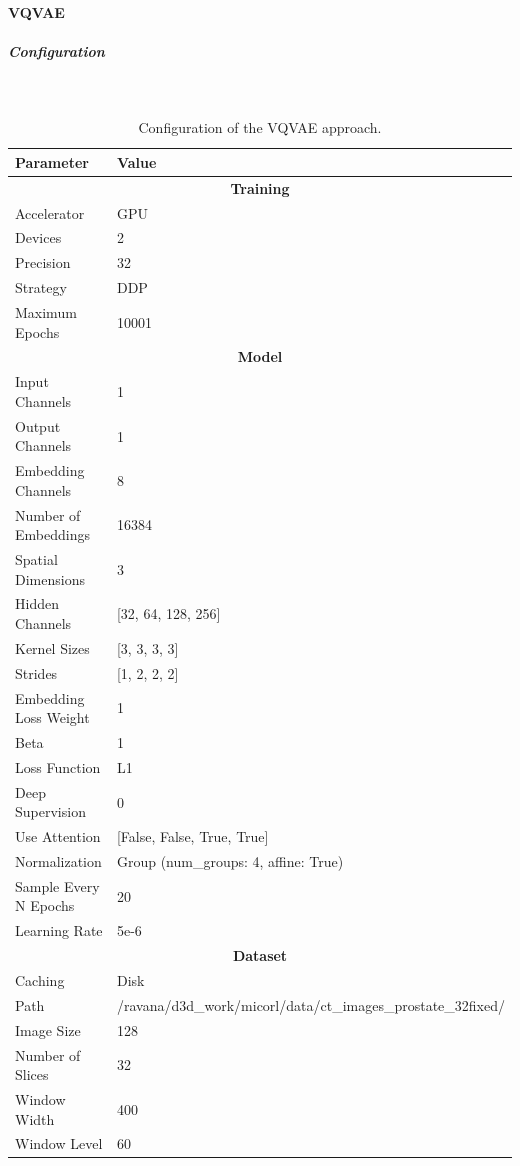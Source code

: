 
\paragraph{VQVAE}\mbox{}
\subparagraph{Configuration}\mbox{}\\

\begin{table}[h!]
\centering
\begin{tabular}{|l|l|}
\hline
\textbf{Parameter} & \textbf{Value} \\
\hline
\multicolumn{2}{|c|}{\textbf{Training}} \\
\hline
Accelerator & GPU \\
\hline
Devices & 2 \\
\hline
Precision & 32 \\
\hline
Strategy & DDP \\
\hline
Maximum Epochs & 10001 \\
\hline
\multicolumn{2}{|c|}{\textbf{Model}} \\
\hline
Input Channels & 1 \\
\hline
Output Channels & 1 \\
\hline
Embedding Channels & 8 \\
\hline
Number of Embeddings & 16384 \\
\hline
Spatial Dimensions & 3 \\
\hline
Hidden Channels & [32, 64, 128, 256] \\
\hline
Kernel Sizes & [3, 3, 3, 3] \\
\hline
Strides & [1, 2, 2, 2] \\
\hline
Embedding Loss Weight & 1 \\
\hline
Beta & 1 \\
\hline
Loss Function & L1 \\
\hline
Deep Supervision & 0 \\
\hline
Use Attention & [False, False, True, True] \\
\hline
Normalization & Group (num\_groups: 4, affine: True) \\
\hline
Sample Every N Epochs & 20 \\
\hline
Learning Rate & 5e-6 \\
\hline
\multicolumn{2}{|c|}{\textbf{Dataset}} \\
\hline
Caching & Disk \\
\hline
Path & /ravana/d3d\_work/micorl/data/ct\_images\_prostate\_32fixed/ \\
\hline
Image Size & 128 \\
\hline
Number of Slices & 32 \\
\hline
Window Width & 400 \\
\hline
Window Level & 60 \\
\hline
\end{tabular}
\caption{Configuration of the VQVAE approach.}
\label{table:training_params}
\end{table}

